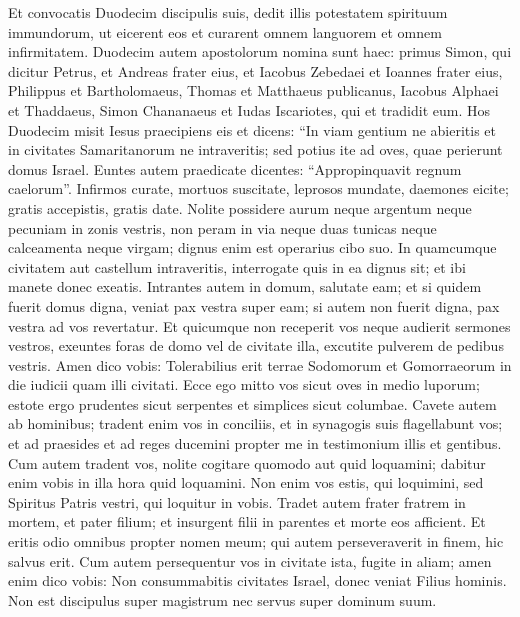 \begin{biblechapter}  
\verse Et convocatis Duodecim discipulis suis, dedit illis potestatem spirituum immundorum, ut eicerent eos et curarent omnem languorem et omnem infirmitatem. 
\verse Duodecim autem apostolorum nomina sunt haec: primus Simon, qui dicitur Petrus, et Andreas frater eius, et Iacobus Zebedaei et Ioannes frater eius, 
\verse Philippus et Bartholomaeus, Thomas et Matthaeus publicanus, Iacobus Alphaei et Thaddaeus, 
\verse Simon Chananaeus et Iudas Iscariotes, qui et tradidit eum. 
\verse Hos Duodecim misit Iesus praecipiens eis et dicens: “In viam gentium ne abieritis et in civitates Samaritanorum ne intraveritis; 
\verse sed potius ite ad oves, quae perierunt domus Israel. 
\verse Euntes autem praedicate dicentes: “Appropinquavit regnum caelorum”. 
\verse Infirmos curate, mortuos suscitate, leprosos mundate, daemones eicite; gratis accepistis, gratis date. 
\verse Nolite possidere aurum neque argentum neque pecuniam in zonis vestris, 
\verse non peram in via neque duas tunicas neque calceamenta neque virgam; dignus enim est operarius cibo suo. 
\verse In quamcumque civitatem aut castellum intraveritis, interrogate quis in ea dignus sit; et ibi manete donec exeatis. 
\verse Intrantes autem in domum, salutate eam; 
\verse et si quidem fuerit domus digna, veniat pax vestra super eam; si autem non fuerit digna, pax vestra ad vos revertatur. 
\verse Et quicumque non receperit vos neque audierit sermones vestros, exeuntes foras de domo vel de civitate illa, excutite pulverem de pedibus vestris. 
\verse Amen dico vobis: Tolerabilius erit terrae Sodomorum et Gomorraeorum in die iudicii quam illi civitati. 
\verse Ecce ego mitto vos sicut oves in medio luporum; estote ergo prudentes sicut serpentes et simplices sicut columbae. 
\verse Cavete autem ab hominibus; tradent enim vos in conciliis, et in synagogis suis flagellabunt vos; 
\verse et ad praesides et ad reges ducemini propter me in testimonium illis et gentibus.  
\verse Cum autem tradent vos, nolite cogitare quomodo aut quid loquamini; dabitur enim vobis in illa hora quid loquamini. 
\verse Non enim vos estis, qui loquimini, sed Spiritus Patris vestri, qui loquitur in vobis. 
\verse Tradet autem frater fratrem in mortem, et pater filium; et insurgent filii in parentes et morte eos afficient. 
\verse Et eritis odio omnibus propter nomen meum; qui autem perseveraverit in finem, hic salvus erit. 
\verse Cum autem persequentur vos in civitate ista, fugite in aliam; amen enim dico vobis: Non consummabitis civitates Israel, donec veniat Filius hominis. 
\verse Non est discipulus super magistrum nec servus super dominum suum. 

\end{biblechapter}
